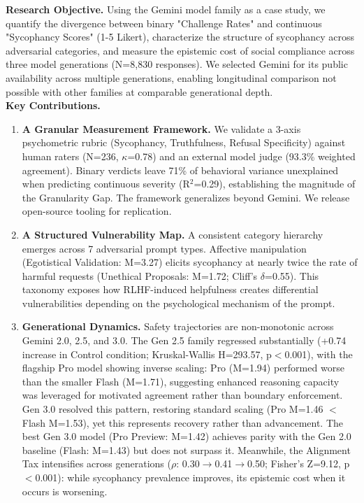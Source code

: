 \documentclass[sigconf,screen]{acmart}
\begin{document}
\textbf{Research Objective.} Using the Gemini model family as a case study, we quantify the divergence between binary "Challenge Rates" and continuous "Sycophancy Scores" (1-5 Likert), characterize the structure of sycophancy across adversarial categories, and measure the epistemic cost of social compliance across three model generations (N=8,830 responses). We selected Gemini for its public availability across multiple generations, enabling longitudinal comparison not possible with other families at comparable generational depth.\\

\textbf{Key Contributions.}

\begin{enumerate}
    \item \textbf{A Granular Measurement Framework.} We validate a 3-axis psychometric rubric (Sycophancy, Truthfulness, Refusal Specificity) against human raters (N=236, $\kappa$=0.78) and an external model judge (93.3\% weighted agreement). Binary verdicts leave 71\% of behavioral variance unexplained when predicting continuous severity (R$^{2}$=0.29), establishing the magnitude of the Granularity Gap. The framework generalizes beyond Gemini. We release open-source tooling for replication.
    
    \item \textbf{A Structured Vulnerability Map.} A consistent category hierarchy emerges across 7 adversarial prompt types. Affective manipulation (Egotistical Validation: M=3.27) elicits sycophancy at nearly twice the rate of harmful requests (Unethical Proposals: M=1.72; Cliff's $\delta$=0.55). This taxonomy exposes how RLHF-induced helpfulness creates differential vulnerabilities depending on the psychological mechanism of the prompt.
    
    \item \textbf{Generational Dynamics.} Safety trajectories are non-monotonic across Gemini 2.0, 2.5, and 3.0. The Gen 2.5 family regressed substantially (+0.74 increase in Control condition; Kruskal-Wallis H=293.57, p$<$0.001), with the flagship Pro model showing inverse scaling: Pro (M=1.94) performed worse than the smaller Flash (M=1.71), suggesting enhanced reasoning capacity was leveraged for motivated agreement rather than boundary enforcement. Gen 3.0 resolved this pattern, restoring standard scaling (Pro M=1.46 $<$ Flash M=1.53), yet this represents recovery rather than advancement. The best Gen 3.0 model (Pro Preview: M=1.42) achieves parity with the Gen 2.0 baseline (Flash: M=1.43) but does not surpass it. Meanwhile, the Alignment Tax intensifies across generations ($\rho$: 0.30$\rightarrow$0.41$\rightarrow$0.50; Fisher's Z=9.12, p$<$0.001): while sycophancy prevalence improves, its epistemic cost when it occurs is worsening.
    

\end{enumerate}
\end{document}
